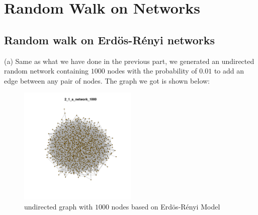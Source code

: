 \documentclass[draftcls,12pt,onecolumn]{IEEEtran}
\begin{document}
\section{Random Walk on Networks}
\subsection{Random walk on Erd\"os-R\'enyi networks}
(a) Same as what we have done in the previous part, we generated an undirected random network containing $1000$ nodes with the probability of $0.01$ to add an edge between any pair of nodes. The graph we got is shown below:
\begin{figure}[H]
\centering
\includegraphics[width=0.5\textwidth]{2_1_a_network_1000.png}
\caption{undirected graph with $1000$ nodes based on Erd\"os-R\'enyi Model}
\label{fig00}
\end{figure}
\end{document}
